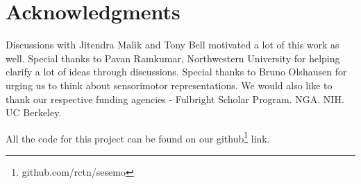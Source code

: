 \documentclass[conference]{IEEEtran}
\begin{document}
\section{ Acknowledgments} 

Discussions with Jitendra Malik and Tony Bell motivated a lot of this work as well. Special thanks to Pavan Ramkumar, Northwestern University for helping clarify a lot of ideas through discussions. Special thanks to Bruno Olshausen for urging us to think about sensorimotor representations. We would also like to thank our respective funding agencies - Fulbright Scholar Program. NGA. NIH. UC Berkeley.

All the code for this project can be found on our github\footnote{github.com/rctn/sesemo} link.




\end{document}

